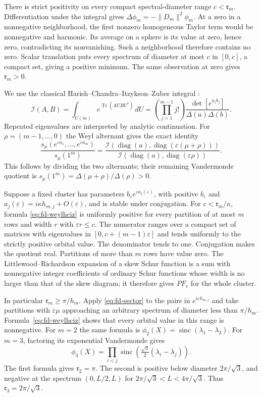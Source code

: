 There is strict positivity on every compact spectral-diameter range
$c<\mathfrak r_m$.  Differentiation under the integral gives
$\Delta\phi_m=-\|D_m\|^2\phi_m$.  At a zero in a nonnegative
neighborhood, the first nonzero homogeneous Taylor term would be
nonnegative and harmonic.  Its average on a sphere is its value at
zero, hence zero, contradicting its nonvanishing.  Such a neighborhood
therefore contains no zero.  Scalar translation puts every spectrum of
diameter at most $c$ in $[0,c]$, a compact set, giving a positive minimum.
The same observation at zero gives $\mathfrak r_m>0$.

We use the classical Harish--Chandra--Itzykson--Zuber integral
\cite[(11)--(12), pp.~312--313]{Zuber2018}:
\[
 \mathcal I(A,B)=\int_{U(m)}e^{\operatorname{Tr}(AUBU^*)}\,dU
  =\left(\prod_{j=1}^{m-1}j!\right)
       \frac{\det[e^{a_i b_j}]}{\Delta(a)\Delta(b)}.
\]
Repeated eigenvalues are interpreted by analytic continuation.
For $\rho=(m-1,\ldots,0)$ the Weyl alternant gives the exact identity
\begin{equation}\label{eq:fd-weylhciz}
 \frac{s_\mu(e^{\varepsilon a_1},\ldots,e^{\varepsilon a_m})}
      {s_\mu(1^m)}
 =\frac{\mathcal I(\operatorname{diag}(a),
                   \operatorname{diag}(\varepsilon(\mu+\rho)))}
        {\mathcal I(\operatorname{diag}(a),
                   \operatorname{diag}(\varepsilon\rho))}.
\end{equation}
This follows by dividing the two alternants; their remaining Vandermonde
quotient is $s_\mu(1^m)=\Delta(\mu+\rho)/\Delta(\rho)>0$.

Suppose a fixed cluster has parameters
$b_\varepsilon e^{\varepsilon a_j(\varepsilon)}$, with positive
$b_\varepsilon$ and
$a_j(\varepsilon)=i\kappa h_{m,j}+O(\varepsilon)$, and is stable
under conjugation.  For $c<\mathfrak r_m/\kappa$, formula
\eqref{eq:fd-weylhciz} is uniformly positive for every partition of
at most $m$ rows and width $r$ with $\varepsilon r\le c$.
The numerator ranges over a compact set of matrices with eigenvalues
in $[0,c+(m-1)\varepsilon]$ and tends uniformly to the strictly
positive orbital value.  The denominator tends to one.  Conjugation
makes the quotient real.  Partitions of more than $m$ rows have value
zero.  The Littlewood--Richardson expansion of a skew Schur function
is a sum with nonnegative integer coefficients of ordinary Schur
functions whose width is no larger than that of the skew diagram;
it therefore gives $PF_r$ for the whole cluster.

In particular $\mathfrak r_m\ge\pi/h_m$.  Apply
\eqref{eq:fd-sector} to the pairs in $e^{i\varepsilon h_{m,j}}$ and
take partitions with $\varepsilon\mu$ approaching an arbitrary
spectrum of diameter less than $\pi/h_m$.  Formula~\eqref{eq:fd-weylhciz}
shows that every orbital value in this range is nonnegative.
For $m=2$ the same formula is
$\phi_2(X)=\operatorname{sinc}(\lambda_1-\lambda_2)$.
For $m=3$, factoring its exponential Vandermonde gives
\[
 \phi_3(X)=\prod_{i<j}\operatorname{sinc}
              \left(\tfrac{\sqrt3}{2}(\lambda_i-\lambda_j)\right).
\]
The first formula gives $\mathfrak r_2=\pi$.  The second is positive
below diameter $2\pi/\sqrt3$, and negative at the spectrum
$(0,L/2,L)$ for $2\pi/\sqrt3<L<4\pi/\sqrt3$.
Thus $\mathfrak r_3=2\pi/\sqrt3$.

